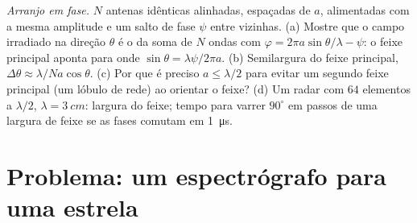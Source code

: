 \begin{exercise}[$\star\star\star$]\label{exo:b2:gratings:12}
\emph{Arranjo em fase.} $N$ antenas idênticas alinhadas, espaçadas de $a$, alimentadas
com a mesma amplitude e um salto de fase $\psi$ entre vizinhas. (a)
Mostre que o campo irradiado na direção $\theta$ é o da soma de
$N$ ondas com $\varphi = 2\pi a\sin\theta/\lambda - \psi$: o feixe principal aponta
para onde $\sin\theta = \lambda\psi/2\pi a$. (b) Semilargura do feixe principal, $\Delta\theta
\approx \lambda/Na\cos\theta$. (c) Por que é preciso $a \le \lambda/2$ para evitar um segundo feixe principal
(um lóbulo de rede) ao orientar o feixe? (d) Um radar com $64$ elementos a
$\lambda/2$, $\lambda = \qty{3}{cm}$: largura do feixe; tempo para varrer $90^\circ$ em passos de uma
largura de feixe se as fases comutam em \qty{1}{\micro s}.
\end{exercise}

\section{Problema: um espectrógrafo para uma estrela}

